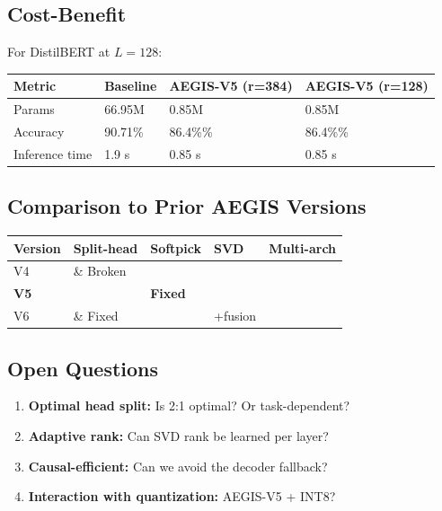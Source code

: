 \subsection{Cost-Benefit}

For DistilBERT at $L = 128$:

\begin{table}[H]
\centering
\small
\begin{tabular}{llll}
\toprule
\textbf{Metric} & \textbf{Baseline} & \textbf{AEGIS-V5 (r=384)} & \textbf{AEGIS-V5 (r=128)} \\
\midrule
Params & 66.95M & 0.85M & 0.85M \\
Accuracy & 90.71\% & 86.4\%\% & 86.4\%\% \\
Inference time & 1.9 s & 0.85 s & 0.85 s \\
\bottomrule
\end{tabular}
\end{table}

\subsection{Comparison to Prior AEGIS Versions}

\begin{table}[H]
\centering
\small
\begin{tabular}{lllll}
\toprule
\textbf{Version} & \textbf{Split-head} & \textbf{Softpick} & \textbf{SVD} & \textbf{Multi-arch} \\
\midrule
V4 &  \& Broken &  &  \\
\textbf{V5} & \textbf{ } & \textbf{Fixed} & \textbf{ } & \textbf{ } \\
V6 &  \& Fixed &  & +fusion \\
\bottomrule
\end{tabular}
\end{table}

\subsection{Open Questions}

\begin{enumerate}
\item \textbf{Optimal head split:} Is 2:1 optimal? Or task-dependent?
\item \textbf{Adaptive rank:} Can SVD rank be learned per layer?
\item \textbf{Causal-efficient:} Can we avoid the decoder fallback?
\item \textbf{Interaction with quantization:} AEGIS-V5 + INT8?

\end{enumerate}
